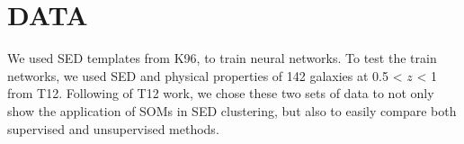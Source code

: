 
\section{DATA}
\label{sec: data}
We used SED templates from K96, to train neural networks.
To test the train networks, we used SED and physical properties of 142 galaxies at 0.5 < $z$ < 1 from T12.
Following of T12 work, we chose these two sets of data to not only show the application of SOMs in SED clustering, but also to easily compare both supervised and unsupervised methods.

